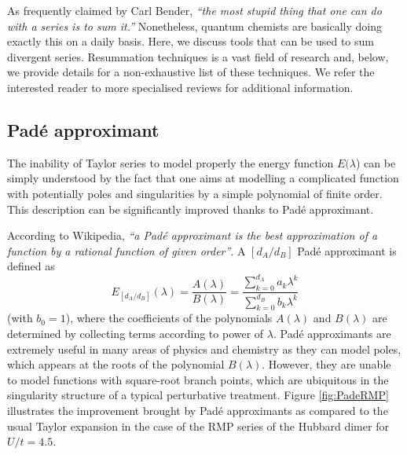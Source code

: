 \documentclass[aps,prb,reprint,noshowkeys,linenumbers,superscriptaddress]{revtex4-1}
\begin{document}
As frequently claimed by Carl Bender, \textit{``the most stupid thing that one can do with a series is to sum it.''}
Nonetheless, quantum chemists are basically doing exactly this on a daily basis.
Here, we discuss tools that can be used to sum divergent series.
Resummation techniques is a vast field of research and, below, we provide details for a non-exhaustive list of these techniques.
We refer the interested reader to more specialised reviews for additional information. \cite{Goodson_2011,Goodson_2019}

\subsection{Pad\'e approximant}
The inability of Taylor series to model properly the energy function $E(\lambda$) can be simply understood by the fact that one aims at modelling a complicated function with potentially poles and singularities by a simple polynomial of finite order.
This description can be significantly improved thanks to Pad\'e approximant. \cite{Pade_1892,BakerBook}

According to Wikipedia, \textit{``a Pad\'e approximant is the best approximation of a function by a rational function of given order''}. 
A $[d_A/d_B]$ Pad\'e approximant is defined as 
\begin{equation}
	\label{eq:PadeApp}
	E_{[d_A/d_B]}(\lambda) = \frac{A(\lambda)}{B(\lambda)} = \frac{\sum_{k=0}^{d_A} a_k \lambda^k}{\sum_{k=0}^{d_B} b_k \lambda^k}
\end{equation}
(with $b_0 = 1$), where the coefficients of the polynomials $A(\lambda)$ and $B(\lambda)$ are determined by collecting terms according to power of $\lambda$.
Pad\'e approximants are extremely useful in many areas of physics and chemistry \cite{Loos_2013,Gluzman_2020} as they can model poles, which appears at the roots of the polynomial $B(\lambda)$. 
However, they are unable to model functions with square-root branch points, which are ubiquitous in the singularity structure of a typical perturbative treatment.
Figure \ref{fig:PadeRMP} illustrates the improvement brought by Pad\'e approximants as compared to the usual Taylor expansion in the case of the RMP series of the Hubbard dimer for $U/t = 4.5$.
\end{document}
